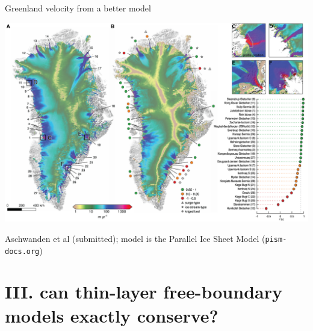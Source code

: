 \documentclass[hide notes,intlimits]{beamer}
\begin{document}
\begin{frame}{Greenland velocity from a better model}
\begin{center}
\includegraphics[width=1.0\textwidth]{greenland-overview}
\end{center}

\vspace{-5mm}
\tiny Aschwanden et al (submitted); model is the Parallel Ice Sheet Model (\texttt{pism-docs.org})
\end{frame}


\section[conservation w free boundaries?]{III. can thin-layer free-boundary models exactly conserve?}
\end{document}
